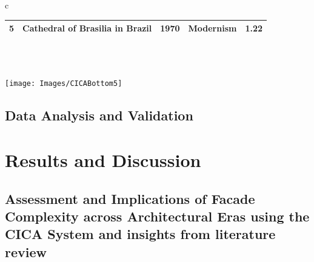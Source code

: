 \begin{linenumbers}
\begin{table}[htb]
\begin{tabular}{c}
\begin{minipage}{\textwidth}
\begin{tabularx}{\linewidth}{c X c c c}
        5 & Cathedral of Brasilia in Brazil & 1970 & Modernism & 1.22 \\
        \bottomrule
        \end{tabularx}
    \end{minipage}
    \\
    \\
    \begin{minipage}{\textwidth}
        \centering
        \texttt{[image: Images/CICABottom5]}
        \label{fig:CICABottom5scores}
    \end{minipage}
\end{tabular}
\end{table}

\subsection{Data Analysis and Validation}
\label{subsec:Data_analysis}



\section{Results and Discussion}
\label{sec:Results}




\subsection{Assessment and Implications of Facade Complexity across Architectural Eras using the CICA System and insights from literature review}
\label{subsec:ResultsComplexityImageAnalysishistory}





\end{linenumbers}
